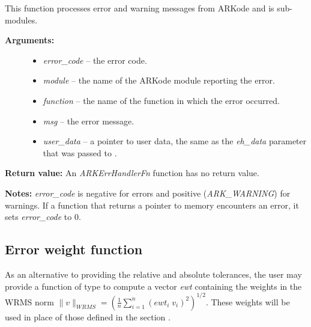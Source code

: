 \documentclass[letterpaper,10pt,english]{sphinxmanual}
\begin{document}
\begin{fulllineitems}
\label{c_interface/User_supplied:c.ARKErrHandlerFn}
This function processes error and warning messages from
ARKode and is sub-modules.
\begin{description}
\item[{\textbf{Arguments:}}] \leavevmode\begin{itemize}
\item {} 
\emph{error\_code} -- the error code.

\item {} 
\emph{module} -- the name of the ARKode module reporting the error.

\item {} 
\emph{function} -- the name of the function in which the error occurred.

\item {} 
\emph{msg} -- the error message.

\item {} 
\emph{user\_data} -- a pointer to user data, the same as the
\emph{eh\_data} parameter that was passed to {\hyperref[c_interface/User_callable:c.ARKodeSetErrHandlerFn]{\emph{}}}.

\end{itemize}

\end{description}

\textbf{Return value:}
An \emph{ARKErrHandlerFn} function has no return value.

\textbf{Notes:} \emph{error\_code} is negative for errors and positive
(\emph{ARK\_WARNING}) for warnings.  If a function that returns a
pointer to memory encounters an error, it sets \emph{error\_code} to
0.

\end{fulllineitems}



\subsection{Error weight function}
\label{c_interface/User_supplied:cinterface-errorweight}\label{c_interface/User_supplied:error-weight-function}
As an alternative to providing the relative and absolute tolerances,
the user may provide a function of type {\hyperref[c_interface/User_supplied:c.ARKEwtFn]{\emph{}}} to compute a
vector \emph{ewt} containing the weights in the WRMS norm
\(\|v\|_{WRMS} = \left(\frac{1}{n} \sum_{i=1}^n \left(ewt_i\; v_i\right)^2
\right)^{1/2}\).  These weights will be used in place of those defined
in the section {\hyperref[Mathematics:mathematics-error-norm]{\emph{}}}.
\end{document}

